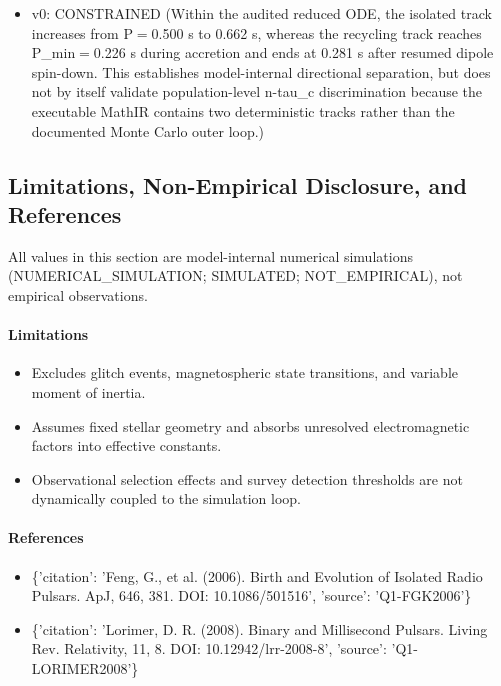 \documentclass[11pt]{article}
\begin{document}
\begin{itemize}
\item v0: CONSTRAINED (Within the audited reduced ODE, the isolated track increases from P\ensuremath{=}0.500 s to 0.662 s, whereas the recycling track reaches P\_min\ensuremath{=}0.226 s during accretion and ends at 0.281 s after resumed dipole spin-down. This establishes model-internal directional separation, but does not by itself validate population-level n-tau\_c discrimination because the executable MathIR contains two deterministic tracks rather than the documented Monte Carlo outer loop.)
\end{itemize}

\subsection{Limitations, Non-Empirical Disclosure, and References}

\noindent All values in this section are model-internal numerical simulations (NUMERICAL\_SIMULATION; SIMULATED; NOT\_EMPIRICAL), not empirical observations.

\paragraph{Limitations}
\begin{itemize}
\item Excludes glitch events, magnetospheric state transitions, and variable moment of inertia.
\item Assumes fixed stellar geometry and absorbs unresolved electromagnetic factors into effective constants.
\item Observational selection effects and survey detection thresholds are not dynamically coupled to the simulation loop.
\end{itemize}

\paragraph{References}
\begin{itemize}
\item \{'citation': 'Feng, G., et al. (2006). Birth and Evolution of Isolated Radio Pulsars. ApJ, 646, 381. DOI: 10.1086/501516', 'source': 'Q1-FGK2006'\}
\item \{'citation': 'Lorimer, D. R. (2008). Binary and Millisecond Pulsars. Living Rev. Relativity, 11, 8. DOI: 10.12942/lrr-2008-8', 'source': 'Q1-LORIMER2008'\}
\end{itemize}
\end{document}
